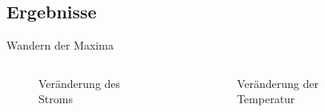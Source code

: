 \documentclass{beamer}
\begin{document}
\subsection{Ergebnisse}
\begin{frame}{Wandern der Maxima}
\begin{columns}
\begin{column}{5cm}
	\begin{figure}[H]
	\caption{Veränderung des Stroms}
	\end{figure}
\end{column}
\begin{column}{5cm}
	\begin{figure}[H]
	\caption{Veränderung der Temperatur}
	\end{figure}
\end{column}
\end{columns}
\end{frame}
\end{document}

